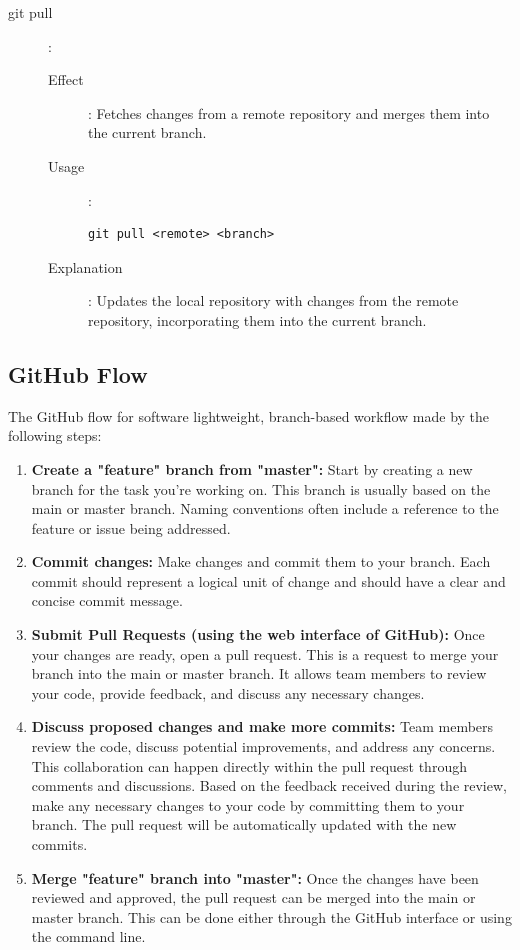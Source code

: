 \begin{description}
\begin{description}
         \end{description}
   \item[git pull]:
         \begin{description}
            \item[Effect]: Fetches changes from a remote repository and merges them into the current branch.
            \item[Usage]:
                  \begin{verbatim}
git pull <remote> <branch>
            \end{verbatim}
            \item[Explanation]: Updates the local repository with changes from the remote repository, incorporating them into the current branch.
         \end{description}
\end{description}

\subsection{GitHub Flow}
The GitHub flow for software lightweight, branch-based workflow made by the following steps:
\begin{enumerate}
   \item \textbf{Create a "feature" branch from "master":} Start by creating a new branch for the task you're working on. This branch is usually based on the main or master branch. Naming conventions often include a reference to the feature or issue being addressed.

   \item \textbf{Commit changes:} Make changes and commit them to your branch. Each commit should represent a logical unit of change and should have a clear and concise commit message.

   \item \textbf{Submit Pull Requests (using the web interface of GitHub):} Once your changes are ready, open a pull request. This is a request to merge your branch into the main or master branch. It allows team members to review your code, provide feedback, and discuss any necessary changes.

   \item \textbf{Discuss proposed changes and make more commits:} Team members review the code, discuss potential improvements, and address any concerns. This collaboration can happen directly within the pull request through comments and discussions. Based on the feedback received during the review, make any necessary changes to your code by committing them to your branch. The pull request will be automatically updated with the new commits.

   \item \textbf{Merge "feature" branch into "master":} Once the changes have been reviewed and approved, the pull request can be merged into the main or master branch. This can be done either through the GitHub interface or using the command line.
\end{enumerate}

